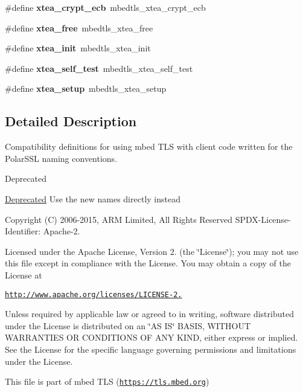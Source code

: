\begin{DoxyCompactItemize}
\mbox{\label{compat-1_83_8h_a75ee8c3dfdaf96ea8b23f56520647b41}} 
\#define {\bfseries xtea\+\_\+crypt\+\_\+ecb}~mbedtls\+\_\+xtea\+\_\+crypt\+\_\+ecb
\item 
\mbox{\label{compat-1_83_8h_ad8792479359b600eb546545eaec49700}} 
\#define {\bfseries xtea\+\_\+free}~mbedtls\+\_\+xtea\+\_\+free
\item 
\mbox{\label{compat-1_83_8h_a48a65d9300f9ee7c2dcc15ebbd2ff301}} 
\#define {\bfseries xtea\+\_\+init}~mbedtls\+\_\+xtea\+\_\+init
\item 
\mbox{\label{compat-1_83_8h_afd9cf0242d1e9e92351be3a2da242beb}} 
\#define {\bfseries xtea\+\_\+self\+\_\+test}~mbedtls\+\_\+xtea\+\_\+self\+\_\+test
\item 
\mbox{\label{compat-1_83_8h_a821b8c5bba5a08b8df9ba0d1a1b9c3d4}} 
\#define {\bfseries xtea\+\_\+setup}~mbedtls\+\_\+xtea\+\_\+setup
\end{DoxyCompactItemize}


\subsection{Detailed Description}
Compatibility definitions for using mbed T\+LS with client code written for the Polar\+S\+SL naming conventions. 

\begin{DoxyRefDesc}{Deprecated}
\item[\mbox{\hyperlink{deprecated__deprecated000001}{Deprecated}}]Use the new names directly instead\end{DoxyRefDesc}


Copyright (C) 2006-\/2015, A\+RM Limited, All Rights Reserved S\+P\+D\+X-\/\+License-\/\+Identifier\+: Apache-\/2.

Licensed under the Apache License, Version 2. (the \char`\"{}\+License\char`\"{}); you may not use this file except in compliance with the License. You may obtain a copy of the License at

\href{http://www.apache.org/licenses/LICENSE-2.0}{\tt http\+://www.\+apache.\+org/licenses/\+L\+I\+C\+E\+N\+S\+E-\/2.}

Unless required by applicable law or agreed to in writing, software distributed under the License is distributed on an \char`\"{}\+A\+S I\+S\char`\"{} B\+A\+S\+IS, W\+I\+T\+H\+O\+UT W\+A\+R\+R\+A\+N\+T\+I\+ES OR C\+O\+N\+D\+I\+T\+I\+O\+NS OF A\+NY K\+I\+ND, either express or implied. See the License for the specific language governing permissions and limitations under the License.

This file is part of mbed T\+LS (\href{https://tls.mbed.org}{\tt https\+://tls.\+mbed.\+org}) 